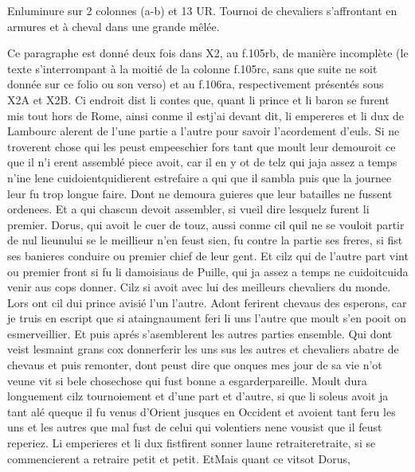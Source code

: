 \documentclass{article}
\begin{document}
\begin{pages}
            
               Enluminure sur 2 colonnes (a-b) et 13 UR.
                  Tournoi de chevaliers s’affrontant en armures et à cheval dans une grande mêlée. 
               
            
\pstart Ce paragraphe est donné deux fois dans X2, au f.105rb, de manière incomplète 
   (le texte s'interrompant à la moitié de la colonne f.105rc, sans que suite ne soit donnée sur ce folio ou son verso) 
   et au f.106ra, respectivement présentés sous X2A et X2B.
   Ci endroit dist li contes que,
   quant li prince et li baron se furent mis tout hors de 
   Rome, 
   ainsi conme il estj'ai devant dit, 
   li empereres et 
   li dux de Lambourc alerent de
   l’une partie a l’autre pour savoir l’acordement d’euls. Si ne troverent chose qui les peust empeeschier
   fors tant que moult leur demouroit ce que il n’i erent assemblé piece avoit,
   car il en y ot de telz qui jaja assez a temps 
   n’ine lene 
   cuidoientquidierent 
   estrefaire a qui que il sambla puis que la journee leur fu trop longue
      faire.
   Dont ne demoura guieres que leur batailles ne fussent ordenees. Et a qui chascun devoit assembler, 
   si vueil dire lesquelz furent li premier. Dorus, qui avoit le cuer de touz, 
   aussi conme cil quil ne se vouloit partir de nul lieunului 
   se le meillieur n’en feust sien, fu contre la partie ses freres, si fist ses banieres conduire ou premier chief de leur gent.
   Et cilz qui de l’autre part vint ou premier front si fu
   li damoisiaus de Puille,
   qui ja assez a temps ne cuidoitcuida venir aus cops donner. 
   Cilz si avoit avec lui des meilleurs chevaliers du monde.
   Lors ont cil dui prince avisié l’un l’autre. 
   Adont ferirent chevaus des esperons,
   car je truis en escript que si ataingnaument feri li uns l’autre que
   moult s’en pooit on esmerveillier. Et puis aprés s’asemblerent les autres parties ensemble.
   Qui dont veist lesmaint grans cox 
   donnerferir les uns sus les autres 
   et chevaliers abatre de chevaus et puis remonter, dont peust dire que onques mes jour de sa vie 
   n’ot veune vit si bele 
      chosechose qui fust bonne a esgarderpareille. \pend
\pstart Moult dura longuement cilz tournoiement et d’une part et d’autre,
   si que li soleus avoit ja tant alé queque il fu venus d'Orient 
   jusques en Occident et avoient tant feru les uns et les autres que mal fust de celui qui volentiers 
   nene vousist que il feust reperiez.
   Li emperieres et li dux 
   fistfirent sonner laune 
   retraiteretraite, si se commencierent a retraire petit et petit. 
   EtMais quant ce
   vitsot Dorus, 

\end{pages}
\end{document}
